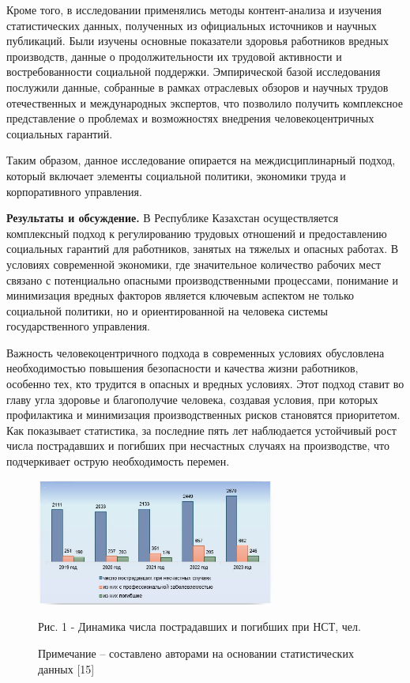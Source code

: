 \begin{multicols}{2}
Кроме того, в исследовании применялись методы контент-анализа и изучения
статистических данных, полученных из официальных источников и научных
публикаций. Были изучены основные показатели здоровья работников вредных
производств, данные о продолжительности их трудовой активности и
востребованности социальной поддержки. Эмпирической базой исследования
послужили данные, собранные в рамках отраслевых обзоров и научных трудов
отечественных и международных экспертов, что позволило получить
комплексное представление о проблемах и возможностях внедрения
человекоцентричных социальных гарантий.

Таким образом, данное исследование опирается на междисциплинарный
подход, который включает элементы социальной политики, экономики труда и
корпоративного управления.

{\bfseries Результаты и обсуждение.} В Республике Казахстан осуществляется
комплексный подход к регулированию трудовых отношений и предоставлению
социальных гарантий для работников, занятых на тяжелых и опасных
работах. В условиях современной экономики, где значительное количество
рабочих мест связано с потенциально опасными производственными
процессами, понимание и минимизация вредных факторов является ключевым
аспектом не только социальной политики, но и ориентированной на человека
системы государственного управления.

Важность человекоцентричного подхода в современных условиях обусловлена
необходимостью повышения безопасности и качества жизни работников,
особенно тех, кто трудится в опасных и вредных условиях. Этот подход
ставит во главу угла здоровье и благополучие человека, создавая условия,
при которых профилактика и минимизация производственных рисков
становятся приоритетом. Как показывает статистика, за последние пять лет
наблюдается устойчивый рост числа пострадавших и погибших при несчастных
случаях на производстве, что подчеркивает острую необходимость перемен.

\end{multicols}



\begin{figure}[H]
	\centering
	\includegraphics[width=0.7\textwidth]{media/ekon/image5.1}
	\caption*{Рис. 1 - Динамика числа пострадавших и погибших при НСТ, чел.}
  \caption*{Примечание -- составлено авторами на основании статистических
  данных {[}15{]}}
\end{figure}

